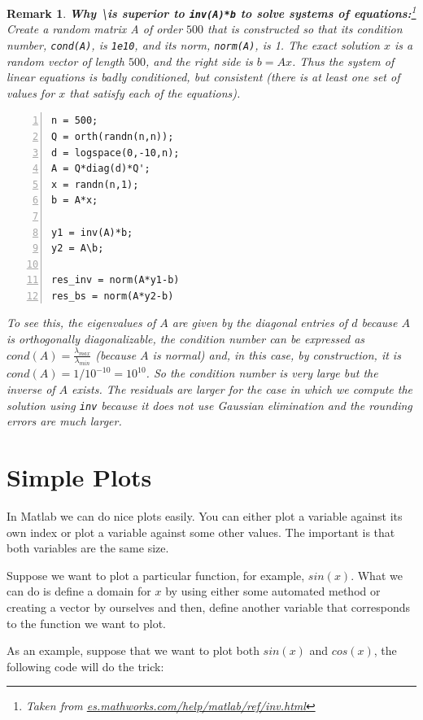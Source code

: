 \documentclass[a4paper,11pt]{article}
\newtheorem{remark}{Remark}
\begin{document}
\begin{remark}

\textbf{Why \textbackslash is superior to \texttt{inv(A)*b} to solve systems of equations:}\footnote{Taken from \url{es.mathworks.com/help/matlab/ref/inv.html}} Create a random matrix A of order $500$ that is constructed so that its condition number, \texttt{cond(A)}, is \texttt{1e10}, and its norm, \texttt{norm(A)}, is 1. The exact solution $x$ is a random vector of length $500$, and the right side is $b = Ax$. Thus the system of linear equations is badly conditioned, but consistent (there is at least one set of values for $x$ that satisfy each of the equations). 

\begin{Verbatim}[numbers=left]
n = 500; 
Q = orth(randn(n,n));
d = logspace(0,-10,n);
A = Q*diag(d)*Q';
x = randn(n,1);
b = A*x;

y1 = inv(A)*b; 
y2 = A\b;

res_inv = norm(A*y1-b)
res_bs = norm(A*y2-b)
\end{Verbatim}

To see this, the eigenvalues of $A$ are given by the diagonal entries of $d$ because $A$ is orthogonally diagonalizable, the condition number can be expressed as $cond(A) = \frac{\lambda_{max}}{\lambda_{min}}$ (because $A$ is normal) and, in this case, by construction, it is $cond(A) = 1/10^{-10} = 10^{10}$. So the condition number is very large but the inverse of $A$ exists. The residuals are larger for the case in which we compute the solution using \texttt{inv} because it does not use Gaussian elimination and the rounding errors are much larger.
\end{remark}

\section{Simple Plots}

In Matlab we can do nice plots easily. You can either plot a variable against its own index or plot a variable against some other values. The important is that both variables are the same size.

Suppose we want to plot a particular function, for example, $sin(x)$. What we can do is define a domain for $x$ by using either some automated method or creating a vector by ourselves and then, define another variable that corresponds to the function we want to plot.

As an example, suppose that we want to plot both $sin(x)$ and $cos(x)$, the following code will do the trick:
\end{document}
